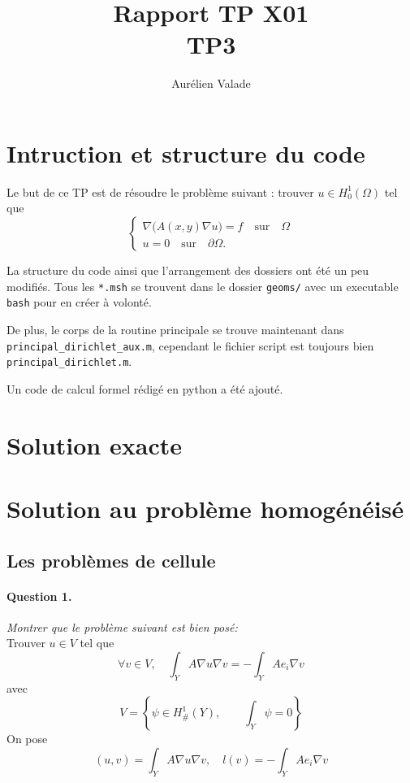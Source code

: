 \documentclass[11pt]{article}
\title{Rapport TP X01 \\ TP3}
\author{Aurélien Valade}
\date{}
\newcommand{\question}[2]{\paragraph{Question #1.}\textit{#2} \\}
\newcommand{\Hd}{H^1_{\#}}
\begin{document}
\maketitle

\section{Intruction et structure du code}


Le but de ce TP est de résoudre le problème suivant : trouver $u \in H^1_0(\Omega)$ tel que  
\begin{equation}
  \begin{cases}
    \nabla \big(A(x,y) \nabla u\big) = f \quad \mbox{sur}\quad \Omega\\
    u = 0 \quad \mbox{sur}\quad \partial\Omega.
  \end{cases}
\end{equation}

La structure du code ainsi que l'arrangement des dossiers ont été un peu modifiés. Tous les \texttt{*.msh} se trouvent dans le dossier \texttt{geoms/} avec un executable \texttt{bash} pour en créer à volonté.

De plus, le corps de la routine principale se trouve maintenant dans \texttt{principal\_dirichlet\_aux.m}, cependant le fichier script est toujours bien \texttt{principal\_dirichlet.m}. 

Un code de calcul formel rédigé en python a été ajouté. 

\section{Solution exacte}


\section{Solution au problème homogénéisé}

\subsection{Les problèmes de cellule}

\question{1}{Montrer que le problème suivant est bien posé:}
Trouver $u \in V$ tel que
\begin{equation}
  \label{eq:pbcell}
  \forall v \in V, \quad \int_Y A \nabla u \nabla v = - \int_Y A e_i \nabla v
\end{equation}
avec
\[
  V = 
  \left\{
    \psi \in \Hd(Y), \qquad \int_Y \psi = 0
  \right\}
\]
On pose
\[
  (u,v) = \int_Y A \nabla u \nabla v, \quad
  l(v) = -\int_Y A e_i \nabla v
\]
\end{document}
